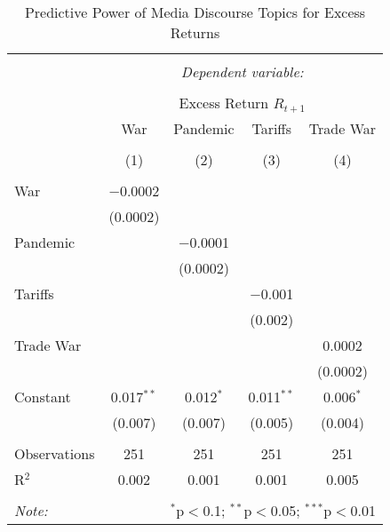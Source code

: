 
\begin{table}[!htbp] \centering 
  \caption{Predictive Power of Media Discourse Topics for Excess Returns} 
  \label{} 
\begin{tabular}{@{\extracolsep{5pt}}lcccc} 
\\[-1.8ex]\hline 
\hline \\[-1.8ex] 
 & \multicolumn{4}{c}{\textit{Dependent variable:}} \\ 
\cline{2-5} 
\\[-1.8ex] & \multicolumn{4}{c}{Excess Return $R_{t+1}$} \\ 
 & War & Pandemic & Tariffs & Trade War \\ 
\\[-1.8ex] & (1) & (2) & (3) & (4)\\ 
\hline \\[-1.8ex] 
 War & $-$0.0002 &  &  &  \\ 
  & (0.0002) &  &  &  \\ 
  Pandemic &  & $-$0.0001 &  &  \\ 
  &  & (0.0002) &  &  \\ 
  Tariffs &  &  & $-$0.001 &  \\ 
  &  &  & (0.002) &  \\ 
  Trade War &  &  &  & 0.0002 \\ 
  &  &  &  & (0.0002) \\ 
  Constant & 0.017$^{**}$ & 0.012$^{*}$ & 0.011$^{**}$ & 0.006$^{*}$ \\ 
  & (0.007) & (0.007) & (0.005) & (0.004) \\ 
 \hline \\[-1.8ex] 
Observations & 251 & 251 & 251 & 251 \\ 
R$^{2}$ & 0.002 & 0.001 & 0.001 & 0.005 \\ 
\hline 
\hline \\[-1.8ex] 
\textit{Note:}  & \multicolumn{4}{r}{$^{*}$p$<$0.1; $^{**}$p$<$0.05; $^{***}$p$<$0.01} \\ 
\end{tabular} 
\end{table} 
